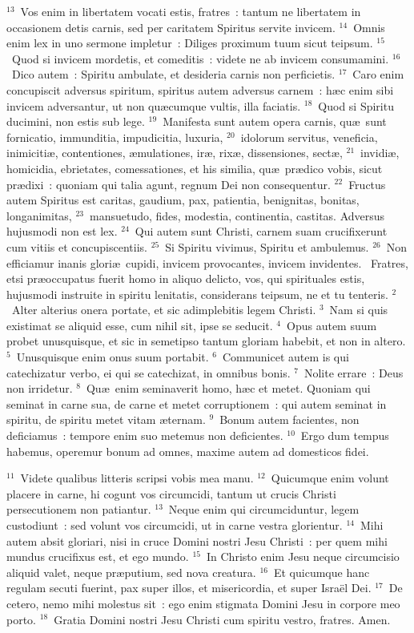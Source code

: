${}^{13}$~Vos enim in libertatem vocati estis, fratres~: tantum ne libertatem in occasionem detis carnis, sed per caritatem Spiritus servite invicem.
${}^{14}$~Omnis enim lex in uno sermone impletur~: Diliges proximum tuum sicut teipsum.
${}^{15}$~Quod si invicem mordetis, et comeditis~: videte ne ab invicem consumamini.
${}^{16}$~Dico autem~: Spiritu ambulate, et desideria carnis non perficietis.
${}^{17}$~Caro enim concupiscit adversus spiritum, spiritus autem adversus carnem~: h\ae c enim sibi invicem adversantur, ut non qu\ae cumque vultis, illa faciatis.
${}^{18}$~Quod si Spiritu ducimini, non estis sub lege.
${}^{19}$~Manifesta sunt autem opera carnis, qu\ae\ sunt fornicatio, immunditia, impudicitia, luxuria,
${}^{20}$~idolorum servitus, veneficia, inimiciti\ae , contentiones, \ae mulationes, ir\ae , rix\ae , dissensiones, sect\ae ,
${}^{21}$~invidi\ae , homicidia, ebrietates, comessationes, et his similia, qu\ae\ pr\ae dico vobis, sicut pr\ae dixi~: quoniam qui talia agunt, regnum Dei non consequentur.
${}^{22}$~Fructus autem Spiritus est caritas, gaudium, pax, patientia, benignitas, bonitas, longanimitas,
${}^{23}$~mansuetudo, fides, modestia, continentia, castitas. Adversus hujusmodi non est lex.
${}^{24}$~Qui autem sunt Christi, carnem suam crucifixerunt cum vitiis et concupiscentiis.
${}^{25}$~Si Spiritu vivimus, Spiritu et ambulemus.
${}^{26}$~Non efficiamur inanis glori\ae\ cupidi, invicem provocantes, invicem invidentes.
~Fratres, etsi pr\ae occupatus fuerit homo in aliquo delicto, vos, qui spirituales estis, hujusmodi instruite in spiritu lenitatis, considerans teipsum, ne et tu tenteris.
${}^{2}$~Alter alterius onera portate, et sic adimplebitis legem Christi.
${}^{3}$~Nam si quis existimat se aliquid esse, cum nihil sit, ipse se seducit.
${}^{4}$~Opus autem suum probet unusquisque, et sic in semetipso tantum gloriam habebit, et non in altero.
${}^{5}$~Unusquisque enim onus suum portabit.
${}^{6}$~Communicet autem is qui catechizatur verbo, ei qui se catechizat, in omnibus bonis.
${}^{7}$~Nolite errare~: Deus non irridetur.
${}^{8}$~Qu\ae\ enim seminaverit homo, h\ae c et metet. Quoniam qui seminat in carne sua, de carne et metet corruptionem~: qui autem seminat in spiritu, de spiritu metet vitam \ae ternam.
${}^{9}$~Bonum autem facientes, non deficiamus~: tempore enim suo metemus non deficientes.
${}^{10}$~Ergo dum tempus habemus, operemur bonum ad omnes, maxime autem ad domesticos fidei.


${}^{11}$~Videte qualibus litteris scripsi vobis mea manu.
${}^{12}$~Quicumque enim volunt placere in carne, hi cogunt vos circumcidi, tantum ut crucis Christi persecutionem non patiantur.
${}^{13}$~Neque enim qui circumciduntur, legem custodiunt~: sed volunt vos circumcidi, ut in carne vestra glorientur.
${}^{14}$~Mihi autem absit gloriari, nisi in cruce Domini nostri Jesu Christi~: per quem mihi mundus crucifixus est, et ego mundo.
${}^{15}$~In Christo enim Jesu neque circumcisio aliquid valet, neque pr\ae putium, sed nova creatura.
${}^{16}$~Et quicumque hanc regulam secuti fuerint, pax super illos, et misericordia, et super Isra\"el Dei.
${}^{17}$~De cetero, nemo mihi molestus sit~: ego enim stigmata Domini Jesu in corpore meo porto.
${}^{18}$~Gratia Domini nostri Jesu Christi cum spiritu vestro, fratres. Amen.
